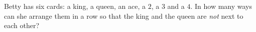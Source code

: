 Betty has six cards: a king, a queen, an ace, a $2$, a $3$ and a $4$. In how many ways can she arrange them in a row so that the king and the queen are \emph{not} next to each other?
